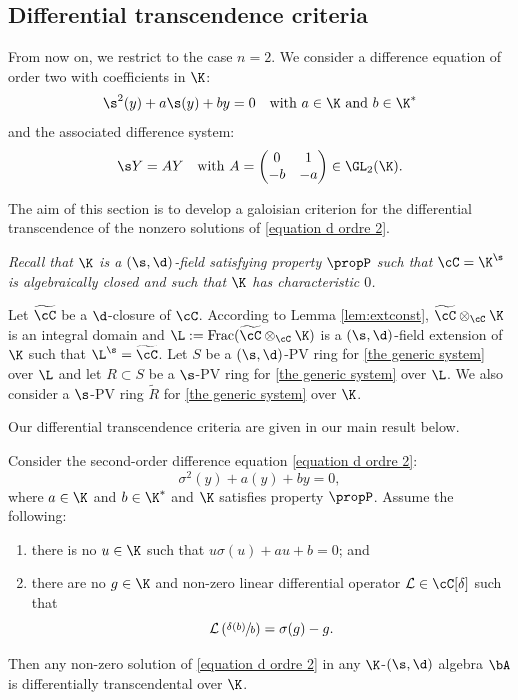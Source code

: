 \subsection{Differential transcendence criteria}

From now on, we restrict to the case $n=2$. We consider a difference equation of order two with coefficients in $\K$:
\begin{equation} \label{equation d ordre 2}
\s^{2}(y) + a \s(y)+by=0 \quad\text{with } a \in \K \text{ and } b\in \K^{*}
\end{equation}
and the associated difference system:
\begin{equation}\label{the generic system}
\s Y=AY \quad\text{with } A= \begin{pmatrix}
0&1\\
-b&-a
\end{pmatrix} \in \GL_{2}(\K).
\end{equation}

The aim of this section is to develop a galoisian criterion for the differential transcendence of the nonzero solutions of \eqref{equation d ordre 2}.

\emph{Recall that $\K$ is a $(\s,\d)$-field satisfying property $\propP$ such that $\cC=\K^{\s}$ is algebraically closed and such that $\K$ has characteristic $0$.}

Let $\widetilde{\cC}$ be a $\d$-closure of $\cC$. According to Lemma \ref{lem:extconst}, $\widetilde{\cC} \otimes_\cC \K$ is an integral domain and $\L:=\mathrm{Frac}(\widetilde{\cC} \otimes_\cC \K)$ is a $(\s,\d)$-field extension of $\K$ such that ${\L^{\s}=\widetilde{\cC}}$.
Let $S$ be a $(\s,\d)$-PV ring for \eqref{the generic system} over $\L$ and let $R \subset S$ be a $\s$-PV ring for \eqref{the generic system} over $\L$.
We also consider a $\s$-PV ring $\widetilde{R}$ for \eqref{the generic system} over $\K$.

Our differential transcendence criteria are given in our main result below.

\begin{theo}\label{theo4}
Consider the second-order difference equation \eqref{equation d ordre 2}:
\[
 \sigma^2(y)+a(y)+by=0,
\]
where $a\in \K$ and $b\in\K^*$ and $\K$ satisfies property $\propP$. Assume the following:
\begin{enumerate}
\item there is no $u\in \K$ such that $u\sigma(u)+au+b=0$; and
\item there are no $g\in\K$ and non-zero linear differential operator $\mathcal{L}\in\cC[\delta]$ such that
\[
\mathcal{L}\left(\sfrac{\delta(b)}{b}\right)=\sigma(g)-g.
\]
\end{enumerate}
Then any non-zero solution of \eqref{equation d ordre 2} in any $\K$-$(\s,\d)$ algebra $\bA$ is differentially transcendental over $\K$.
\end{theo}

